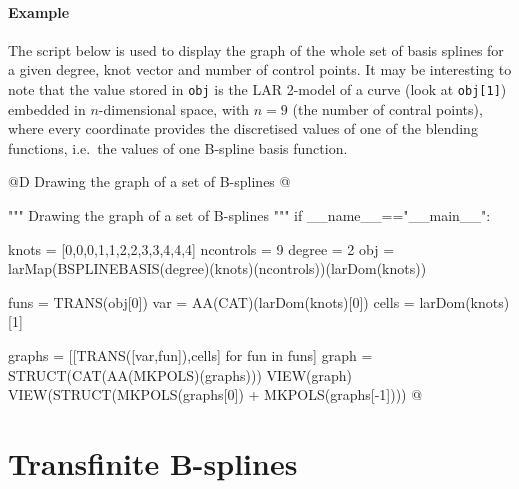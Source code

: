 \documentclass[11pt,oneside]{article}	%
\begin{document}
\paragraph{Example}

The script below is used to display the graph of the whole set of basis splines 
for a given degree, knot vector and number of control points. It may be interesting to note that
the value stored in \texttt{obj} is the LAR 2-model of a curve (look at \texttt{obj[1]}) embedded in 
$n$-dimensional space, with $n=9$ (the number of contral points), where every coordinate provides the 
discretised values of one of the blending functions, i.e.~the values of one B-spline basis function. 

@D Drawing the graph of a set of B-splines
@{""" Drawing the graph of a set of B-splines """
if __name__=="__main__":

	knots = [0,0,0,1,1,2,2,3,3,4,4,4]
	ncontrols = 9
	degree = 2
	obj = larMap(BSPLINEBASIS(degree)(knots)(ncontrols))(larDom(knots))
	
	funs = TRANS(obj[0])
	var = AA(CAT)(larDom(knots)[0])
	cells = larDom(knots)[1]
	
	graphs =  [[TRANS([var,fun]),cells] for fun in funs]
	graph = STRUCT(CAT(AA(MKPOLS)(graphs)))
	VIEW(graph)
	VIEW(STRUCT(MKPOLS(graphs[0]) + MKPOLS(graphs[-1])))
@}


\section{Transfinite B-splines}
\end{document}
